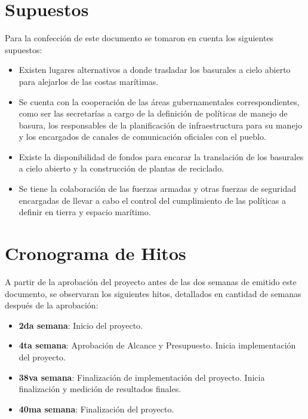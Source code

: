 \documentclass[a4paper,11pt]{article}
\begin{document}
\section{Supuestos}

Para la confección de este documento se tomaron en cuenta los siguientes
supuestos:

\begin{itemize}

  \item Existen lugares alternativos a donde trasladar los basurales a cielo
    abierto para alejarlos de las costas marítimas.

  \item Se cuenta con la cooperación de las áreas gubernamentales
    correspondientes, como ser las secretarías a cargo de la definición de
    políticas de manejo de basura, los responsables de la planificación de
    infraestructura para su manejo y los encargados de canales de comunicación
    oficiales con el pueblo.

  \item Existe la disponibilidad de fondos para encarar la translación de los
    basurales a cielo abierto y la construcción de plantas de reciclado.

  \item Se tiene la colaboración de las fuerzas armadas y otras fuerzas de
    seguridad encargadas de llevar a cabo el control del cumplimiento de las
    políticas a definir en tierra y espacio marítimo.

\end{itemize}

\section{Cronograma de Hitos}

A partir de la aprobación del proyecto antes de las dos semanas de emitido este
documento, se observaran los siguientes hitos, detallados en cantidad de
semanas después de la aprobación:

\begin{itemize}

  \item \textbf{2da semana}: Inicio del proyecto.

  \item \textbf{4ta semana}: Aprobación de Alcance y Presupuesto. Inicia
    implementación del proyecto.

  \item \textbf{38va semana}: Finalización de implementación del proyecto.
    Inicia finalización y medición de resultados finales.

  \item \textbf{40ma semana}: Finalización del proyecto.

\end{itemize}
\end{document}
